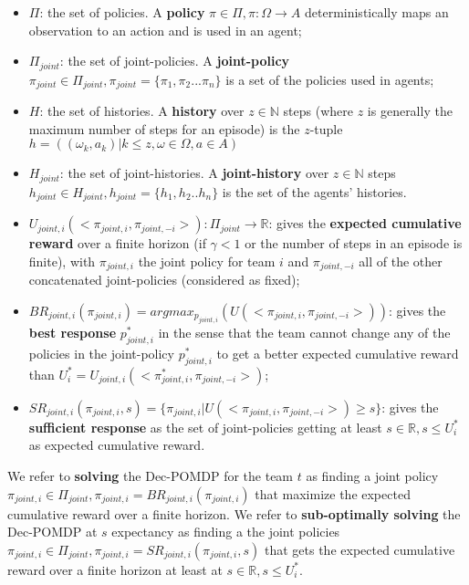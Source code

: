 \documentclass[runningheads]{llncs}
\begin{document}
\begin{itemize}

    \item $\Pi$: the set of policies. A \textbf{policy} $\pi \in \Pi, \pi: \Omega \rightarrow A$ deterministically maps an observation to an action and is used in an agent;
    \item $\Pi_{joint}$: the set of joint-policies. A \textbf{joint-policy} $\pi_{joint} \in \Pi_{joint}, \pi_{joint} = \{\pi_1, \pi_2...\pi_n\}$ is a set of the policies used in agents;
    \item $H$: the set of histories. A \textbf{history} over $z \in \mathbb{N}$ steps (where $z$ is generally the maximum number of steps for an episode) is the $z$-tuple $h = ((\omega_{k}, a_{k}) | k \leq z, \omega \in \Omega, a \in A)$
    \item $H_{joint}$: the set of joint-histories. A \textbf{joint-history} over $z \in \mathbb{N}$ steps $h_{joint} \in H_{joint}, h_{joint} = \{h_1,h_2..h_n\}$ is the set of the agents' histories.
    \item $U_{joint,i}(<\pi_{joint,i}, \pi_{joint,-i}>): \Pi_{joint} \rightarrow \mathbb{R}$: gives the \textbf{expected cumulative reward} over a finite horizon (if $\gamma < 1$ or the number of steps in an episode is finite), with $\pi_{joint,i}$ the joint policy for team $i$ and $\pi_{joint,-i}$ all of the other concatenated joint-policies (considered as fixed);
    \item $BR_{joint,i}(\pi_{joint,i}) = argmax_{p_{joint,i}}(U(<\pi_{joint,i},\pi_{joint,-i}>))$: gives the \textbf{best response} $p_{joint,i}^*$ in the sense that the team cannot change any of the policies in the joint-policy $p_{joint,i}^*$ to get a better expected cumulative reward than $U_i^* = U_{joint,i}(<\pi_{joint,i}^*, \pi_{joint,-i}>)$;
    \item $SR_{joint,i}(\pi_{joint,i}, s) = \{\pi_{joint,i} | U(<\pi_{joint,i},\pi_{joint,-i}>) \geq s\}$: gives the \textbf{sufficient response} as the set of joint-policies getting at least $s \in \mathbb{R}, s \leq U_i^*$ as expected cumulative reward.
\end{itemize}

We refer to \textbf{solving} the Dec-POMDP for the team $t$ as finding a joint policy $\pi_{joint,i} \in \Pi_{joint}, \pi_{joint,i} = BR_{joint,i}(\pi_{joint,i})$ that maximize the expected cumulative reward over a finite horizon.
We refer to \textbf{sub-optimally solving} the Dec-POMDP at $s$ expectancy as finding a the joint policies $\pi_{joint,i} \in \Pi_{joint}, \pi_{joint,i} = SR_{joint,i}(\pi_{joint,i}, s)$ that gets the expected cumulative reward over a finite horizon at least at $s \in \mathbb{R}, s \leq U_i^*$.
\end{document}
